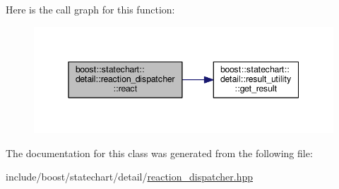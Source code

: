 Here is the call graph for this function\+:
\nopagebreak
\begin{figure}[H]
\begin{center}
\leavevmode
\includegraphics[width=345pt]{classboost_1_1statechart_1_1detail_1_1reaction__dispatcher_aeded743093739575529fa22b3a63b27f_cgraph}
\end{center}
\end{figure}


The documentation for this class was generated from the following file\+:\begin{DoxyCompactItemize}
\item 
include/boost/statechart/detail/\mbox{\hyperlink{reaction__dispatcher_8hpp}{reaction\+\_\+dispatcher.\+hpp}}\end{DoxyCompactItemize}
